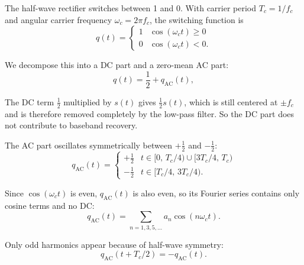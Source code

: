 \begin{tcolorbox}[breakable, colback=orange!5!white,
colframe=orange!60!black,
title={\textbf{Intuition: Fourier Series of the Rectification Function (Part 1: Decomposition of $q(t)$)}}]
The half-wave rectifier switches between 1 and 0. With carrier period
$T_c = 1/f_c$ and angular carrier frequency $\omega_c = 2\pi f_c$, the
switching function is
\begin{equation}
q(t)=
\begin{cases}
1 & \cos(\omega_c t) \geq 0 \\
0 & \cos(\omega_c t) < 0.
\end{cases}
\end{equation}

We decompose this into a DC part and a zero-mean AC part:
\begin{equation}
q(t)=\frac{1}{2}+q_{\mathrm{AC}}(t),
\end{equation}

The DC term $\tfrac{1}{2}$ multiplied by $s(t)$ gives $\tfrac{1}{2}s(t)$, which
is still centered at $\pm f_c$ and is therefore removed completely by the
low-pass filter. So the DC part does not contribute to baseband recovery.

The AC part oscillates symmetrically between $+\tfrac{1}{2}$ and
$-\tfrac{1}{2}$:
\begin{equation}
q_{\mathrm{AC}}(t)=
\begin{cases}
+\tfrac{1}{2} & t \in [0,\,T_c/4) \cup [3T_c/4,\,T_c) \\
-\tfrac{1}{2} & t \in [T_c/4,\,3T_c/4).
\end{cases}
\end{equation}

Since $\cos(\omega_c t)$ is even, $q_{\mathrm{AC}}(t)$ is also even, so its
Fourier series contains only cosine terms and no DC:
\begin{equation}
q_{\mathrm{AC}}(t)=\sum_{n=1,3,5,\ldots} a_n \cos(n\omega_c t).
\end{equation}

Only odd harmonics appear because of half-wave symmetry:
\begin{equation}
q_{\mathrm{AC}}(t+T_c/2)=-q_{\mathrm{AC}}(t).
\end{equation}
\end{tcolorbox}

